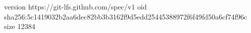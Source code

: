 version https://git-lfs.github.com/spec/v1
oid sha256:5c1419032b2aa6dec82bb3b3162f9d5edd25445388972f6f49fd50a6cf74f96c
size 12384
